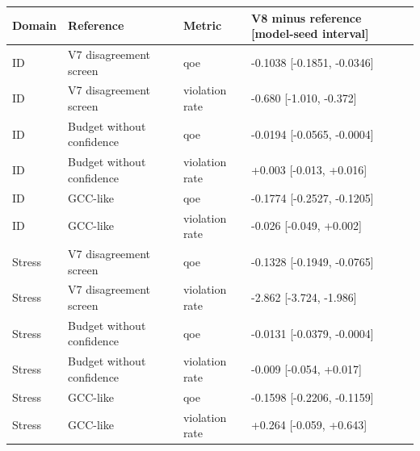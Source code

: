 \begin{tabular}{llll}
\toprule
Domain & Reference & Metric & V8 minus reference [model-seed interval] \\
\midrule
ID & V7 disagreement screen & qoe & -0.1038 [-0.1851, -0.0346] \\
ID & V7 disagreement screen & violation rate & -0.680 [-1.010, -0.372] \\
ID & Budget without confidence & qoe & -0.0194 [-0.0565, -0.0004] \\
ID & Budget without confidence & violation rate & +0.003 [-0.013, +0.016] \\
ID & GCC-like & qoe & -0.1774 [-0.2527, -0.1205] \\
ID & GCC-like & violation rate & -0.026 [-0.049, +0.002] \\
Stress & V7 disagreement screen & qoe & -0.1328 [-0.1949, -0.0765] \\
Stress & V7 disagreement screen & violation rate & -2.862 [-3.724, -1.986] \\
Stress & Budget without confidence & qoe & -0.0131 [-0.0379, -0.0004] \\
Stress & Budget without confidence & violation rate & -0.009 [-0.054, +0.017] \\
Stress & GCC-like & qoe & -0.1598 [-0.2206, -0.1159] \\
Stress & GCC-like & violation rate & +0.264 [-0.059, +0.643] \\
\bottomrule
\end{tabular}
